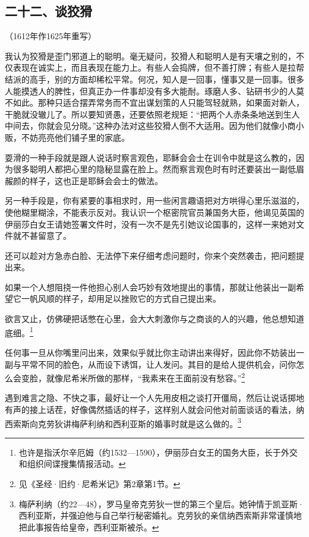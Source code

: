 \subsection*{二十二、谈狡猾}
\begin{center}
    （1612年作1625年重写）
\end{center}
\par 我认为狡猾是歪门邪道上的聪明。毫无疑问，狡猾人和聪明人是有天壤之别的，不仅表现在诚实上，而且表现在能力上。有些人会捣牌，但不善打牌；有些人是拉帮结派的高手，别的方面却稀松平常。何况，知人是一回事，懂事又是一回事。很多人能摸透人的脾性，但真正办一件事却没有多大能耐。琢磨人多、钻研书少的人莫不如此。那种只适合摆弄常务而不宜出谋划策的人只能驾轻就熟，如果面对新人，干脆就没辙儿了。所以要知贤愚，还要依照老规矩：“把两个人赤条条地送到生人中间去，你就会见分晓。”这种办法对这些狡猾人倒不大适用。因为他们就像小商小贩，不妨亮亮他们铺子里的家底。
\par 耍滑的一种手段就是跟人说话时察言观色，耶稣会会士在训令中就是这么教的，因为很多聪明人都把心里的隐秘显露在脸上。然而察言观色时有时还要装出一副低眉赧颜的样子，这也正是耶稣会会士的做法。
\par 另一种手段是，你有紧要的事相求时，用一些闲言趣语把对方哄得心里乐滋滋的，使他糊里糊涂，不能表示反对。我认识一个枢密院官员兼国务大臣，他谒见英国的伊丽莎白女王请她签署文件时，没有一次不是先引她议论国事的，这样一来她对文件就不甚留意了。
\par 还可以趁对方急赤白脸、无法停下来仔细考虑问题时，你来个突然袭击，把问题提出来。
\par 如果一个人想阻挠一件他担心别人会巧妙有效地提出的事情，那就让他装出一副希望它一帆风顺的样子，却用足以挫败它的方式自己提出来。
\par 欲言又止，仿佛硬把话憋在心里，会大大刺激你与之商谈的人的兴趣，他总想知道底细。\footnote{也许是指沃尔辛厄姆（约1532—1590），伊丽莎白女王的国务大臣，长于外交和组织间谍搜集情报活动。}
\par 任何事一旦从你嘴里问出来，效果似乎就比你主动讲出来得好，因此你不妨装出一副与平常不同的脸色，从而设下诱饵，让人发问。其目的是给人提供机会，问你怎么会变脸，就像尼希米所做的那样，“我素来在王面前没有愁容。”\footnote{见《圣经·旧约·尼希米记》第2章第1节。}
\par 遇到难言之隐、不快之事，最好让一个人先用皮相之谈打开僵局，然后让说话掷地有声的接上话茬，好像偶然插话的样子，这样别人就会问他对前面谈话的看法，纳西索斯向克劳狄讲梅萨利纳和西利亚斯的婚事时就是这么做的。\footnote{梅萨利纳（约22—48），罗马皇帝克劳狄一世的第三个皇后。她钟情于凯亚斯·西利亚斯，并强迫他与自己举行秘密婚礼。克劳狄的亲信纳西索斯非常谨慎地把此事报告给皇帝，西利亚斯被杀。}
